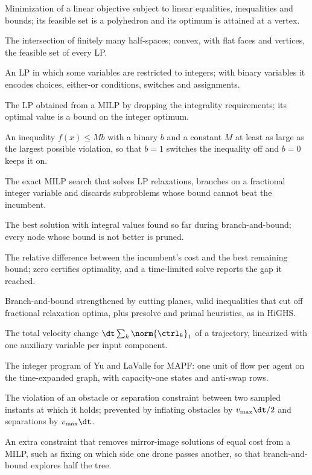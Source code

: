 \item[Linear program (LP)] Minimization of a linear objective subject to linear equalities, inequalities and bounds; its feasible set is a polyhedron and its optimum is attained at a vertex.
\item[Polyhedron] The intersection of finitely many half-spaces; convex, with flat faces and vertices, the feasible set of every LP.
\item[Mixed-integer linear program (MILP)] An LP in which some variables are restricted to integers; with binary variables it encodes choices, either-or conditions, switches and assignments.
\item[LP relaxation] The LP obtained from a MILP by dropping the integrality requirements; its optimal value is a bound on the integer optimum.
\item[Big-$M$ constraint] An inequality $f(x) \le M b$ with a binary $b$ and a constant $M$ at least as large as the largest possible violation, so that $b = 1$ switches the inequality off and $b = 0$ keeps it on.
\item[Branch-and-bound] The exact MILP search that solves LP relaxations, branches on a fractional integer variable and discards subproblems whose bound cannot beat the incumbent.
\item[Incumbent] The best solution with integral values found so far during branch-and-bound; every node whose bound is not better is pruned.
\item[MIP gap] The relative difference between the incumbent's cost and the best remaining bound; zero certifies optimality, and a time-limited solve reports the gap it reached.
\item[Branch-and-cut] Branch-and-bound strengthened by cutting planes, valid inequalities that cut off fractional relaxation optima, plus presolve and primal heuristics, as in HiGHS.
\item[Minimum-fuel objective] The total velocity change $\dt \sum_k \norm{\ctrl_k}_1$ of a trajectory, linearized with one auxiliary variable per input component.
\item[Time-expanded flow formulation] The integer program of Yu and LaValle for MAPF: one unit of flow per agent on the time-expanded graph, with capacity-one states and anti-swap rows.
\item[Corner cutting] The violation of an obstacle or separation constraint between two sampled instants at which it holds; prevented by inflating obstacles by $v_{\max}\dt/2$ and separations by $v_{\max}\dt$.
\item[Symmetry breaking] An extra constraint that removes mirror-image solutions of equal cost from a MILP, such as fixing on which side one drone passes another, so that branch-and-bound explores half the tree.
